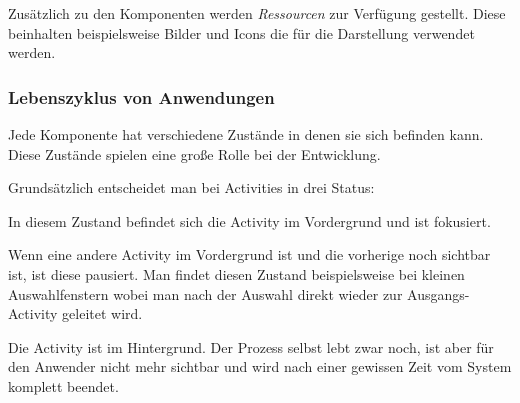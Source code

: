 Zusätzlich zu den Komponenten werden \emph{Ressourcen} zur Verfügung gestellt. Diese beinhalten beispielsweise Bilder und Icons die für die Darstellung verwendet werden.

\subsubsection{Lebenszyklus von Anwendungen}

Jede Komponente hat verschiedene Zustände in denen sie sich befinden kann. Diese Zustände spielen eine große Rolle bei der Entwicklung. 

Grundsätzlich entscheidet man bei Activities in drei Status:

\begin{description}[style=nextline]
	\item[Resumed] In diesem Zustand befindet sich die Activity im Vordergrund und ist fokusiert. 
	\item[Paused] Wenn eine andere Activity im Vordergrund ist und die vorherige noch sichtbar ist, ist diese pausiert. Man findet diesen Zustand beispielsweise bei kleinen Auswahlfenstern wobei man nach der Auswahl direkt wieder zur Ausgangs-Activity geleitet wird.
	\item[Stopped] Die Activity ist im Hintergrund. Der Prozess selbst lebt zwar noch, ist aber für den Anwender nicht mehr sichtbar und wird nach einer gewissen Zeit vom System komplett beendet. 
\end{description}

